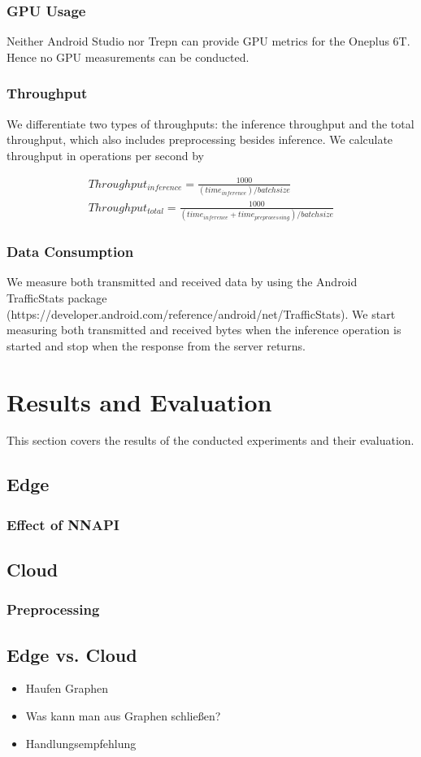 \subsubsection{GPU Usage}
Neither Android Studio nor Trepn can provide GPU metrics for the Oneplus 6T. Hence no GPU measurements can be conducted.
\subsubsection{Throughput}
We differentiate two types of throughputs: the inference throughput and the total throughput, which also includes preprocessing besides inference.
We calculate throughput in operations per second by 

\begin{equation*}
\begin{gathered}
Throughput_{inference} =\frac{1000}{(time_{inference}) / batchsize}\\
Throughput_{total}  =\frac{1000}{(time_{inference} + time_{preprocessing}) / batchsize}
\end{gathered}
\end{equation*}
\subsubsection{Data Consumption}
We measure both transmitted and received data by using the Android TrafficStats package (https://developer.android.com/reference/android/net/TrafficStats). We start measuring both transmitted and received bytes when the inference operation is started and stop when the response from the server returns. 
\section{Results and Evaluation}
This section covers the results of the conducted experiments and their evaluation.
\subsection{Edge}
\subsubsection{Effect of NNAPI}
\subsection{Cloud}
\subsubsection{Preprocessing}
\subsection{Edge vs. Cloud}

\begin{itemize}
    \item Haufen Graphen
    \item Was kann man aus Graphen schließen?
    \item Handlungsempfehlung
\end{itemize}



\endinput 
